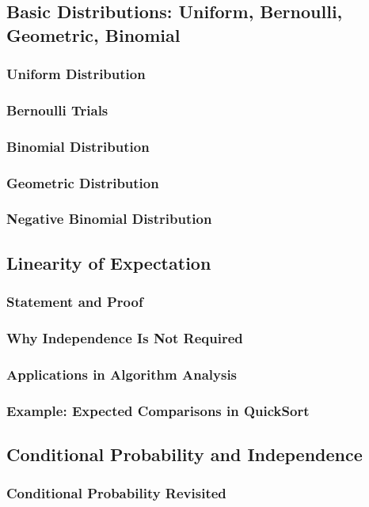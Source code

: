 \subsection{Basic Distributions: Uniform, Bernoulli, Geometric, Binomial}
\subsubsection{Uniform Distribution}
\subsubsection{Bernoulli Trials}
\subsubsection{Binomial Distribution}
\subsubsection{Geometric Distribution}
\subsubsection{Negative Binomial Distribution}

\subsection{Linearity of Expectation}
\subsubsection{Statement and Proof}
\subsubsection{Why Independence Is Not Required}
\subsubsection{Applications in Algorithm Analysis}
\subsubsection{Example: Expected Comparisons in QuickSort}

\subsection{Conditional Probability and Independence}
\subsubsection{Conditional Probability Revisited}
